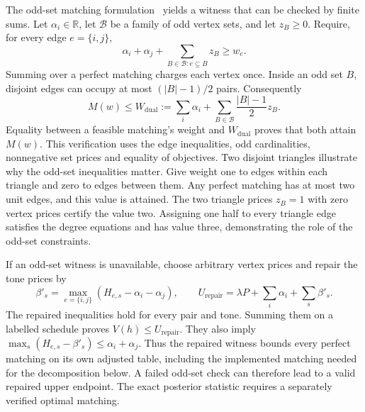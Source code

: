 The odd-set matching formulation~\cite{edmonds} yields a witness that can be checked by finite sums. Let $\alpha_i\in\mathbb R$, let $\mathcal B$ be a family of odd vertex sets, and let $z_B\ge0$. Require, for every edge $e=\{i,j\}$,
\begin{equation}
 \alpha_i+\alpha_j+\sum_{B\in\mathcal B:e\subseteq B}z_B\ge w_e.
 \label{supp:odd-inequality}
\end{equation}
Summing over a perfect matching charges each vertex once. Inside an odd set $B$, disjoint edges can occupy at most $(|B|-1)/2$ pairs. Consequently
\begin{equation}
 M(w)\le W_{\mathrm{dual}}
 :=\sum_i\alpha_i+\sum_{B\in\mathcal B}\frac{|B|-1}{2}z_B.
 \label{supp:odd-objective}
\end{equation}
Equality between a feasible matching's weight and $W_{\mathrm{dual}}$ proves that both attain $M(w)$. This verification uses the edge inequalities, odd cardinalities, nonnegative set prices and equality of objectives. Two disjoint triangles illustrate why the odd-set inequalities matter. Give weight one to edges within each triangle and zero to edges between them. Any perfect matching has at most two unit edges, and this value is attained. The two triangle prices $z_B=1$ with zero vertex prices certify the value two. Assigning one half to every triangle edge satisfies the degree equations and has value three, demonstrating the role of the odd-set constraints.

If an odd-set witness is unavailable, choose arbitrary vertex prices and repair the tone prices by
\begin{equation}
 \beta'_s=\max_{e=\{i,j\}}(H_{e,s}-\alpha_i-\alpha_j),\qquad
 U_{\mathrm{repair}}=\lambda P+\sum_i\alpha_i+\sum_s\beta'_s.
 \label{supp:p3}
\end{equation}
The repaired inequalities hold for every pair and tone. Summing them on a labelled schedule proves $V(h)\le U_{\mathrm{repair}}$. They also imply $\max_s(H_{e,s}-\beta'_s)\le\alpha_i+\alpha_j$. Thus the repaired witness bounds every perfect matching on its own adjusted table, including the implemented matching needed for the decomposition below. A failed odd-set check can therefore lead to a valid repaired upper endpoint. The exact posterior statistic requires a separately verified optimal matching.

